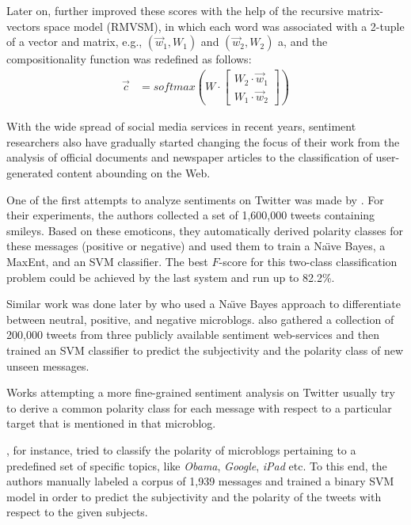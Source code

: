 Later on, \citet{Socher:12} further improved these scores with the
help of the recursive matrix-vectors space model (RMVSM), in which
each word was associated with a 2-tuple of a vector and matrix, e.g.,
$(\vec{w}_1, W_1)$ and $(\vec{w}_2, W_2)$ a, and the compositionality
function was redefined as follows:
\begin{align*}
  \vec{c} &= softmax\left(W\cdot\begin{bmatrix}
  W_2\cdot\vec{w}_1\\
  W_1\cdot\vec{w}_2
  \end{bmatrix}\right)
\end{align*}

With the wide spread of social media services in recent years,
sentiment researchers also have gradually started changing the focus
of their work from the analysis of official documents and newspaper
articles to the classification of user-generated content abounding on
the Web.

One of the first attempts to analyze sentiments on Twitter was made by
\citet{Go:09}.  For their experiments, the authors collected a set of
1,600,000 tweets containing smileys.  Based on these emoticons, they
automatically derived polarity classes for these messages (positive or
negative) and used them to train a Na\"{\i}ve Bayes, a MaxEnt, and an
SVM classifier.  The best $F$-score for this two-class classification
problem could be achieved by the last system and run up to 82.2\%.

Similar work was done later by \citet{Pak:10} who used a Na\"{\i}ve
Bayes approach to differentiate between neutral, positive, and
negative microblogs. \citet{Barbosa:10} also gathered a collection of
200,000 tweets from three publicly available sentiment web-services
and then trained an SVM classifier to predict the subjectivity and the
polarity class of new unseen messages.

Works attempting a more fine-grained sentiment analysis on Twitter
usually try to derive a common polarity class for each message with
respect to a particular target that is mentioned in that microblog.

\citet{Jiang:11}, for instance, tried to classify the polarity of
microblogs pertaining to a predefined set of specific topics, like
\emph{Obama}, \emph{Google}, \emph{iPad} etc.  To this end, the
authors manually labeled a corpus of 1,939 messages and trained a
binary SVM model in order to predict the subjectivity and the polarity
of the tweets with respect to the given subjects.

